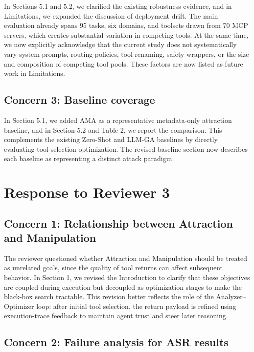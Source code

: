\documentclass[11pt]{article}
\begin{document}
In Sections 5.1 and 5.2,
we clarified the existing robustness evidence,
and in Limitations,
we expanded the discussion of deployment drift.
The main evaluation already spans 95 tasks,
six domains,
and toolsets drawn from 70 MCP servers,
which creates substantial variation in competing tools.
At the same time,
we now explicitly acknowledge that the current study
does not systematically vary system prompts,
routing policies,
tool renaming,
safety wrappers,
or the size and composition of competing tool pools.
These factors are now listed as future work in Limitations.

\subsection*{Concern 3: Baseline coverage}

In Section 5.1,
we added AMA as a representative metadata-only attraction baseline,
and in Section 5.2 and Table 2,
we report the comparison.
This complements the existing Zero-Shot and LLM-GA baselines
by directly evaluating tool-selection optimization.
The revised baseline section now describes each baseline
as representing a distinct attack paradigm.

\section{Response to Reviewer 3}

\subsection*{Concern 1: Relationship between Attraction and Manipulation}

The reviewer questioned whether Attraction and Manipulation
should be treated as unrelated goals,
since the quality of tool returns can affect subsequent behavior.
In Section 1,
we revised the Introduction to clarify that these objectives
are coupled during execution
but decoupled as optimization stages
to make the black-box search tractable.
This revision better reflects the role of the Analyzer--Optimizer loop:
after initial tool selection,
the return payload is refined using execution-trace feedback
to maintain agent trust and steer later reasoning.

\subsection*{Concern 2: Failure analysis for ASR results}
\end{document}
